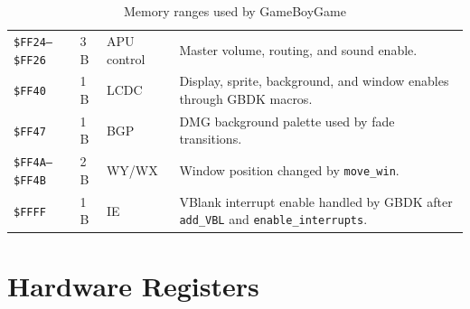 \begin{table}[h]
\begin{tabular}{p{2.6cm}p{1.7cm}p{2.6cm}p{6.4cm}}
\texttt{\$FF24--\$FF26} & 3 B & APU control & Master volume, routing, and sound enable. \\
\texttt{\$FF40} & 1 B & LCDC & Display, sprite, background, and window enables through GBDK macros. \\
\texttt{\$FF47} & 1 B & BGP & DMG background palette used by fade transitions. \\
\texttt{\$FF4A--\$FF4B} & 2 B & WY/WX & Window position changed by \texttt{move\_win}. \\
\texttt{\$FFFF} & 1 B & IE & VBlank interrupt enable handled by GBDK after \texttt{add\_VBL} and \texttt{enable\_interrupts}. \\
\bottomrule
\end{tabular}
\caption{Memory ranges used by GameBoyGame}
\end{table}

\section{Hardware Registers}


